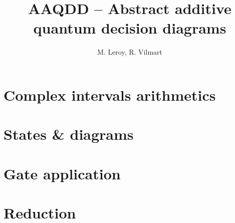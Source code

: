 \documentclass[a4paper]{report}
\title{AAQDD -- Abstract additive quantum decision diagrams}
\author{M. Leroy, R. Vilmart}
\theoremstyle{break}
\begin{document}
\maketitle

\tableofcontents

\newpage

\chapter{Complex intervals arithmetics}



\chapter{States \& diagrams}



\chapter{Gate application}



\chapter{Reduction}


\end{document}

